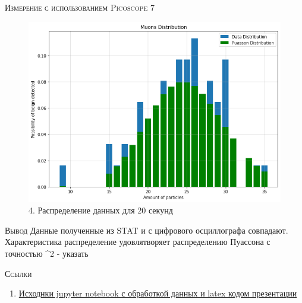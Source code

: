 \documentclass{beamer}%
\begin{document}
\begin{frame}{\textsc{Измерение с использованием Picoscope 7}}
\begin{figure}
    \centering
    \includegraphics[scale=0.45]{images/outputGraph3.png}
    \caption{4. Распределение данных для 20 секунд}
    \label{fig:my_label}
\end{figure}
\end{frame}  

\begin{frame}{\textsc{Вывод}}
    \large Данные полученные из STAT и с цифрового осциллографа совпадают. Характеристика распределение удовлятворяет распределению Пуассона с точностью \chi^2 - указать
\end{frame}  

\begin{frame}{\textsc{Ссылки}}
    \begin{enumerate}
        \item \href{https://github.com/hK04/LabWorksFIrstSem/tree/main/CosmicRaysRadiation}{Исходнки jupyter notebook с обработкой данных и latex кодом презентации}
    \end{enumerate}
\end{frame}  
\end{document}
